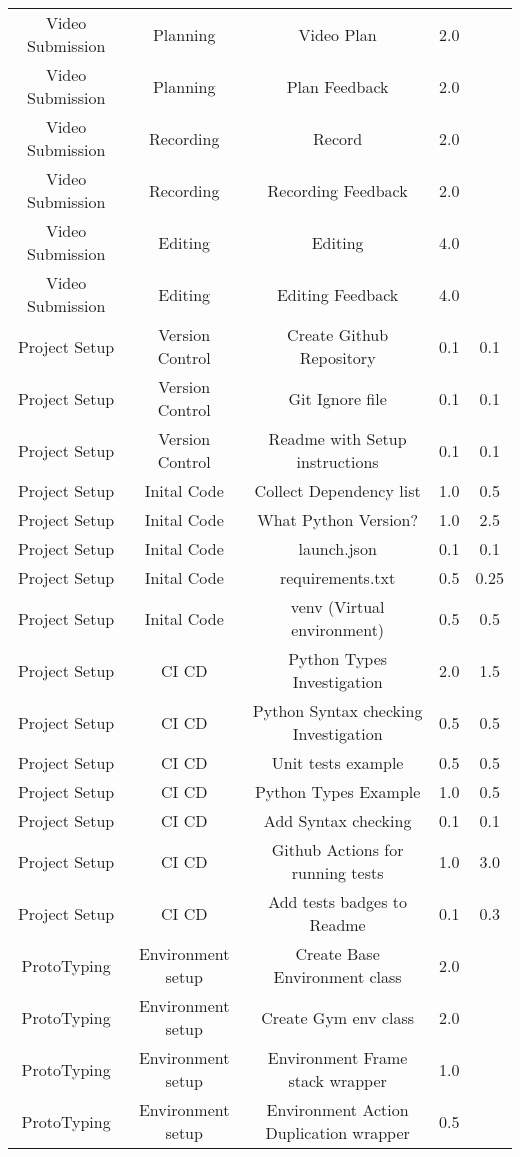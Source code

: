 \begin{longtable}{|c|c|c|c|c|}
	Video Submission & Planning & Video Plan & 2.0 &  \\
	Video Submission & Planning & Plan Feedback & 2.0 &  \\
	Video Submission & Recording & Record & 2.0 &  \\
	Video Submission & Recording & Recording Feedback & 2.0 &  \\
	Video Submission & Editing & Editing & 4.0 &  \\
	Video Submission & Editing & Editing Feedback & 4.0 &  \\
	Project Setup & Version Control & Create Github Repository & 0.1 & 0.1 \\
	Project Setup & Version Control & Git Ignore file & 0.1 & 0.1 \\
	Project Setup & Version Control & Readme with Setup instructions & 0.1 & 0.1 \\
	Project Setup & Inital Code & Collect Dependency list & 1.0 & 0.5 \\
	Project Setup & Inital Code & What Python Version? & 1.0 & 2.5 \\
	Project Setup & Inital Code & launch.json & 0.1 & 0.1 \\
	Project Setup & Inital Code & requirements.txt & 0.5 & 0.25 \\
	Project Setup & Inital Code & venv (Virtual environment) & 0.5 & 0.5 \\
	Project Setup & CI CD & Python Types Investigation & 2.0 & 1.5 \\
	Project Setup & CI CD & Python Syntax checking Investigation & 0.5 & 0.5 \\
	Project Setup & CI CD & Unit tests example & 0.5 & 0.5 \\
	Project Setup & CI CD & Python Types Example & 1.0 & 0.5 \\
	Project Setup & CI CD & Add Syntax checking  & 0.1 & 0.1 \\
	Project Setup & CI CD & Github Actions for running tests & 1.0 & 3.0 \\
	Project Setup & CI CD & Add tests badges to Readme & 0.1 & 0.3 \\
	ProtoTyping & Environment setup & Create Base Environment class & 2.0 &  \\
	ProtoTyping & Environment setup & Create Gym env class & 2.0 &  \\
	ProtoTyping & Environment setup & Environment Frame stack wrapper & 1.0 &  \\
	ProtoTyping & Environment setup & Environment Action Duplication wrapper & 0.5 &  \\

\end{longtable}
